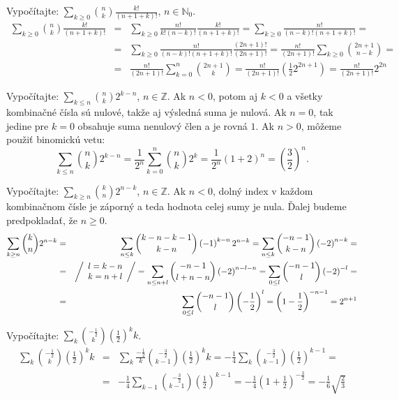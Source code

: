 
\pr Vypočítajte: $\sum_{k\geq0} {n \choose k}\frac{k!}{\left(n+1+k\right)!}$, $n\in \mathbb{N}_0$.
\begin{eqnarray*}
\sum_{k\geq0} {n \choose k}\frac{k!}{\left(n+1+k\right)!} &=& \sum_{k\geq0} \frac{n!}{k!\left(n-k\right)!}\frac{k!}{\left(n+1+k\right)!} = \sum_{k\geq0}\frac{n!}{\left(n-k\right)!\left(n+1+k\right)!} =\\
&=& \sum_{k\geq0}\frac{n!}{\left(n-k\right)!\left(n+1+k\right)!}\frac{\left(2n+1\right)!}{\left(2n+1\right)!} = \frac{n!}{\left(2n+1\right)!}\sum_{k\geq0} {2n+1 \choose n-k} =\\
&=& \frac{n!}{\left(2n+1\right)!}\sum_{k=0}^n {2n+1 \choose k} = \frac{n!}{\left(2n+1\right)!}\left(\frac12 2^{2n+1}\right) = \frac{n!}{\left(2n+1\right)!}2^{2n}
\end{eqnarray*}

\pr Vypočítajte: $\sum_{k \leq n}{n \choose k}2^{k-n}$, $n \in \mathbb{Z}$.
 Ak $n<0$, potom aj $k<0$ a všetky kombinačné čísla sú nulové, takže aj výsledná suma je nulová. Ak $n=0$, tak jedine pre $k=0$ obsahuje suma nenulový člen a je rovná $1$. Ak $n>0$, môžeme použiť binomickú vetu:
$$
\sum_{k \leq n}{n \choose k}2^{k-n} = \frac1{2^n} \sum_{k=0}^n{n \choose k}2^k = \frac1{2^n} \left(1+2\right)^n = \left(\frac32\right)^n.
$$

\pr Vypočítajte: $\sum_{k \geq n}{k \choose n}2^{n-k}$, $n \in \mathbb{Z}$.
 Ak $n<0$, dolný index v každom kombinačnom čísle je záporný a teda hodnota celej sumy je nula. Ďalej budeme predpokladať, že $n\geq0$.
\begin{eqnarray*}
\sum_{k \geq n}{k \choose n}2^{n-k} &=& \sum_{n\leq k}{k-n-k-1 \choose k-n}\left(-1\right)^{k-n}2^{n-k} = \sum_{n\leq k}{-n-1 \choose k-n}\left(-2\right)^{n-k} = \\
&=& \left/\begin{array}{l}
l = k-n\\
k = n+l
\end{array}\right/ = \sum_{n\leq n+l}{-n-1 \choose l+n-n}\left(-2\right)^{n-l-n} = \sum_{0 \leq l} {-n-1\choose l}\left(-2\right)^{-l} = \\
&=& \sum_{0\leq l}{-n-1 \choose l} \left(-\frac12\right)^l = \left(1 - \frac12\right)^{-n-1} = 2^{n+1}
\end{eqnarray*}

\pr Vypočítajte: $\sum_k{-\frac12 \choose k}\left(\frac12\right)^k k$.
\begin{eqnarray*}
\sum_k{-\frac12 \choose k}\left(\frac12\right)^k k &=& \sum_k\frac{-\frac12}k{-\frac32 \choose k-1}\left(\frac12\right)^k k = -\frac14 \sum_k{-\frac32 \choose k-1}\left(\frac12\right)^{k-1} = \\
&=& -\frac14 \sum_{k-1}{-\frac32 \choose k-1}\left(\frac12\right)^{k-1} = -\frac14\left(1+\frac12\right)^{-\frac32} = -\frac16 \sqrt{\frac23}
\end{eqnarray*}

